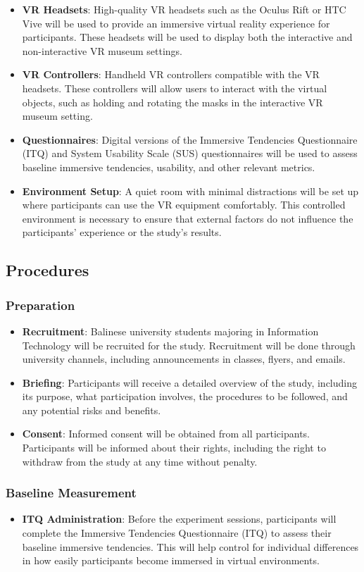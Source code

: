 \documentclass[conference]{IEEEtran}
\begin{document}
\begin{itemize}
    \item \textbf{VR Headsets}: High-quality VR headsets such as the Oculus Rift or HTC Vive will be used to provide an immersive virtual reality experience for participants. These headsets will be used to display both the interactive and non-interactive VR museum settings.
    \item \textbf{VR Controllers}: Handheld VR controllers compatible with the VR headsets. These controllers will allow users to interact with the virtual objects, such as holding and rotating the masks in the interactive VR museum setting.
    \item \textbf{Questionnaires}: Digital versions of the Immersive Tendencies Questionnaire (ITQ) and System Usability Scale (SUS) questionnaires will be used to assess baseline immersive tendencies, usability, and other relevant metrics.
   \item \textbf{Environment Setup}: A quiet room with minimal distractions will be set up where participants can use the VR equipment comfortably. This controlled environment is necessary to ensure that external factors do not influence the participants' experience or the study's results.
\end{itemize}
\subsection{Procedures}
\subsubsection{Preparation}
\begin{itemize}
    \item \textbf{Recruitment}: Balinese university students majoring in Information Technology will be recruited for the study. Recruitment will be done through university channels, including announcements in classes, flyers, and emails.
    \item \textbf{Briefing}: Participants will receive a detailed overview of the study, including its purpose, what participation involves, the procedures to be followed, and any potential risks and benefits.
    \item \textbf{Consent}: Informed consent will be obtained from all participants. Participants will be informed about their rights, including the right to withdraw from the study at any time without penalty.
\end{itemize}
\subsubsection{Baseline Measurement}
\begin{itemize}
    \item \textbf{ITQ Administration}: Before the experiment sessions, participants will complete the Immersive Tendencies Questionnaire (ITQ) to assess their baseline immersive tendencies. This will help control for individual differences in how easily participants become immersed in virtual environments.
\end{itemize}
\end{document}
